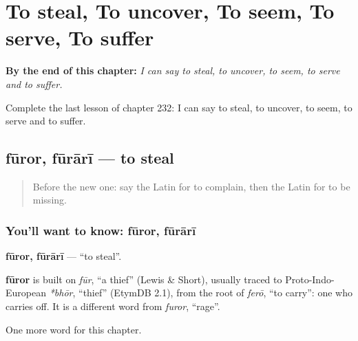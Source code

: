 
\chapter{To steal, To uncover, To seem, To serve, To suffer}
\label{ch:la-to-steal-to-uncover-to-seem-to-serve-to-suffer}

\begin{chapteropening}
\textbf{By the end of this chapter:} \emph{I can say to steal, to uncover, to seem, to serve and to suffer.}

Complete the last lesson of chapter 232: I can say to steal, to uncover, to seem, to serve and to suffer.
\end{chapteropening}

\section[fūror, fūrārī]{fūror, fūrārī — to steal}

\label{lesson:LA-C232-furor}



\begin{quote}
Before the new one: say the Latin for to complain, then the Latin for to be missing.
\end{quote}

\subsection*{You'll want to know: fūror, fūrārī}
\textbf{fūror, fūrārī} — \textquotedblleft{}to steal\textquotedblright{}.

\begin{cousinweb}
\textbf{fūror} is built on \emph{fūr}, \textquotedblleft{}a thief\textquotedblright{} (Lewis \& Short), usually traced to Proto-Indo-European \emph{*bhōr}, \textquotedblleft{}thief\textquotedblright{} (EtymDB 2.1), from the root of \emph{ferō}, \textquotedblleft{}to carry\textquotedblright{}: one who carries off. It is a different word from \emph{furor}, \textquotedblleft{}rage\textquotedblright{}.
\end{cousinweb}

\begin{grammarlens}[title={What you've built}]
One more word for this chapter.
\end{grammarlens}

